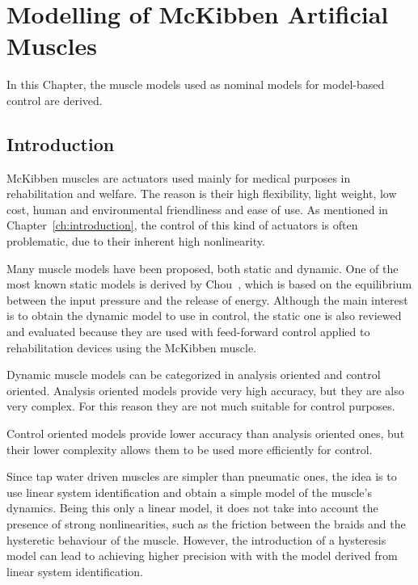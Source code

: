 
\chapter{Modelling of McKibben Artificial Muscles}

In this Chapter, the muscle models used as nominal models for model-based control are derived.

\section{Introduction}

McKibben muscles are actuators used mainly for medical purposes in rehabilitation and welfare. 
The reason is their high flexibility, light weight, low cost, human and environmental friendliness and ease of use.
As mentioned in Chapter~\ref{ch:introduction}, the control of this kind of actuators
is often problematic, due to their inherent high nonlinearity.

Many muscle models have been proposed, both static and dynamic.
One of the most known static models is derived by Chou~\cite{model_chou},
which is based on the equilibrium between the input pressure and the release of energy.
Although the main interest is to obtain the dynamic model to use in control, 
the static one is also reviewed and evaluated because they are used with feed-forward
control applied to rehabilitation devices using the McKibben muscle. 

Dynamic muscle models can be categorized in analysis oriented and control oriented.
Analysis oriented models provide very high accuracy, but they are also very complex.
For this reason they are not much suitable for control purposes.

Control oriented models provide lower accuracy than analysis oriented ones,
but their lower complexity allows them to be used more efficiently for control.


Since tap water driven muscles are simpler than pneumatic ones, the idea is to use
linear system identification and obtain a simple model of the muscle's dynamics.
Being this only a linear model,
it does not take into account the presence of strong nonlinearities,
such as the friction between the braids and the hysteretic behaviour of the muscle.
However, the introduction of a hysteresis model can lead to achieving higher precision
with with the model derived from linear system identification.

